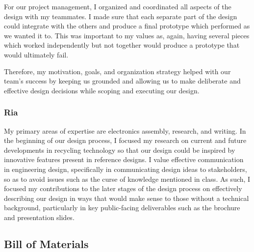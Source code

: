 \documentclass[12pt]{article}
\begin{document}
\begin{multicols*}{2}
                For our project management, I organized and coordinated all aspects of the design with my teammates. I made sure that each separate part of the design could integrate with the others and produce a final prototype which performed as we wanted it to. This was important to my values as, again, having several pieces which worked independently but not together would produce a prototype that would ultimately fail. 

                Therefore, my motivation, goals, and organization strategy helped with our team's success by keeping us grounded and allowing us to make deliberate and effective design decisions while scoping and executing our design.


            \subsubsection{Ria}
                My primary areas of expertise are electronics assembly, research, and writing. In the beginning of our design process, I focused my research on current and future developments in recycling technology so that our design could be inspired by innovative features present in reference designs. I value effective communication in engineering design, specifically in communicating design ideas to stakeholders, so as to avoid issues such as the curse of knowledge mentioned in class. As such, I focused my contributions to the later stages of the design process on effectively describing our design in ways that would make sense to those without a technical background, particularly in key public-facing deliverables such as the brochure and presentation slides.


        \newpage

    \end{multicols*}

        \subsection{Bill of Materials}
\end{document}
